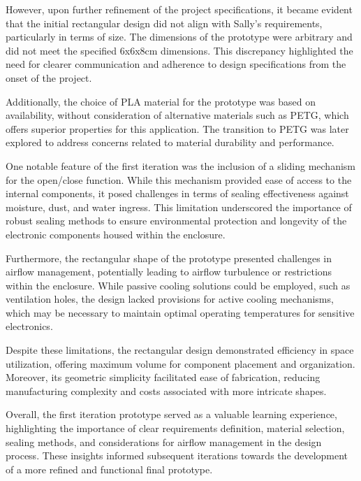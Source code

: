 \documentclass[class=report,11pt,crop=false]{standalone}
\begin{document}
However, upon further refinement of the project specifications, it became evident that the initial rectangular design did not align with Sally's requirements, particularly in terms of size. The dimensions of the prototype were arbitrary and did not meet the specified 6x6x8cm dimensions. This discrepancy highlighted the need for clearer communication and adherence to design specifications from the onset of the project.
\newline

Additionally, the choice of PLA material for the prototype was based on availability, without consideration of alternative materials such as PETG, which offers superior properties for this application. The transition to PETG was later explored to address concerns related to material durability and performance.
\newline

One notable feature of the first iteration was the inclusion of a sliding mechanism for the open/close function. While this mechanism provided ease of access to the internal components, it posed challenges in terms of sealing effectiveness against moisture, dust, and water ingress. This limitation underscored the importance of robust sealing methods to ensure environmental protection and longevity of the electronic components housed within the enclosure.
\newline

Furthermore, the rectangular shape of the prototype presented challenges in airflow management, potentially leading to airflow turbulence or restrictions within the enclosure. While passive cooling solutions could be employed, such as ventilation holes, the design lacked provisions for active cooling mechanisms, which may be necessary to maintain optimal operating temperatures for sensitive electronics.
\newline

Despite these limitations, the rectangular design demonstrated efficiency in space utilization, offering maximum volume for component placement and organization. Moreover, its geometric simplicity facilitated ease of fabrication, reducing manufacturing complexity and costs associated with more intricate shapes.
\newline

Overall, the first iteration prototype served as a valuable learning experience, highlighting the importance of clear requirements definition, material selection, sealing methods, and considerations for airflow management in the design process. These insights informed subsequent iterations towards the development of a more refined and functional final prototype.
\newline
\end{document}
